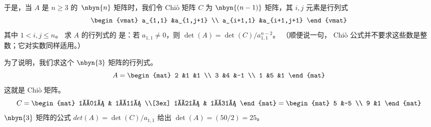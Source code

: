 于是，当 $A$ 是 $n\geq 3$ 的~$\nbyn{n}$ 矩阵时，我们令 Chiò 矩阵 $C$ 为
$\nbyn{(n-1)}$ 矩阵，其 $i,j$ 元素是行列式
\begin{equation*}
  \begin{vmat}
    a_{1,1}  &a_{1,j+1} \\
    a_{i+1,1}    &a_{i+1,j+1}
  \end{vmat}
\end{equation*}
其中 $1<i,j\leq n$。
求 $A$ 的行列式的 
是：若 $a_{1,1}\neq 0$，则
$\det(A)=\det(C)/a_{1,1}^{n-2}$。
（顺便说一句，
Chiò 公式并不要求这些数是整数；它对实数同样适用。）

为了说明，我们求这个 $\nbyn{3}$ 矩阵的行列式。
\begin{equation*} 
  A=
  \begin{mat}
    2 &1 &1 \\
    3 &4 &-1 \\
    1 &5 &1 
  \end{mat}
\end{equation*}
这就是 Chiò 矩阵。
\begin{equation*}
  C=
  \begin{mat}
    \begin{vmat}
      2 &1 \\
      3 &4
    \end{vmat}
   &
   \begin{vmat}
     2 &1 \\
     3 &-1
   \end{vmat}        \\[3ex]      
   \begin{vmat}
     2 &1 \\
     1 &5
   \end{vmat}
   &
   \begin{vmat}
     2 &1 \\
     1 &1
   \end{vmat}
  \end{mat}
  =
  \begin{mat}
    5  &-5  \\
    9  &1
  \end{mat}
\end{equation*}
$\nbyn{3}$ 矩阵的公式
$det(A)=\det(C)/a_{1,1}$ 给出 $\det(A)=(50/2)=25$。

